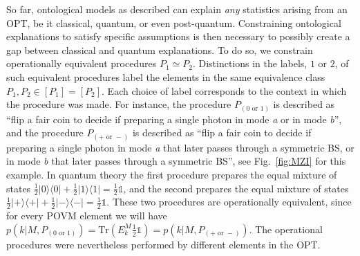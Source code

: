 \documentclass[a4paper,twocolumn,11pt,accepted=2024-01-17]{quantumarticle}
\begin{document}
So far, ontological models as described can explain \textit{any} statistics arising from an OPT, be it classical, quantum, or even post-quantum.  Constraining ontological explanations to satisfy specific assumptions is then necessary to possibly create a gap between classical and quantum explanations. To do so, we constrain operationally equivalent procedures $P_1 \simeq P_2$. Distinctions in the labels, $1$ or $2$, of such equivalent procedures label the elements in the same equivalence class $P_1 , P_2 \in [P_1] = [P_2]$. Each choice of label corresponds to the context in which the procedure was made. For instance, the procedure $P_{(0\text{ or }1)}$ is described as ``flip a fair coin to decide if preparing a single photon in mode \textit{a} or in mode \textit{b}'', and the procedure $P_{(+\text{ or }-)}$ is described as ``flip a fair coin to decide if preparing a single photon in mode \textit{a} that later passes through a symmetric BS, or in mode \textit{b} that later passes through a symmetric BS'', see Fig.~\ref{fig:MZI} for this example. In quantum theory the first procedure prepares the equal mixture of states $\frac{1}{2}\vert 0 \rangle \langle 0 \vert + \frac{1}{2}\vert 1 \rangle \langle 1 \vert = \frac{1}{2}\mathbb{1}$, and the second prepares the equal mixture of states $\frac{1}{2}\vert + \rangle \langle + \vert + \frac{1}{2}\vert - \rangle \langle - \vert = \frac{1}{2}\mathbb{1}$. These two procedures are operationally equivalent, since for every POVM element we will have $p(k\vert M, P_{(0\text{ or }1)}) = \text{Tr}(E_k^M \frac{1}{2}\mathbb{1}) = p(k\vert M, P_{(+\text{ or }-)})$. The operational procedures were nevertheless performed by different elements in the OPT. 
\end{document}
